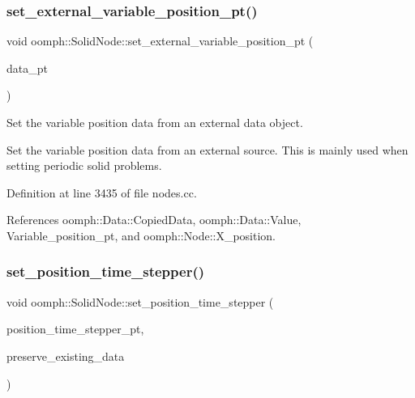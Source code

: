 \subsubsection{\texorpdfstring{set\+\_\+external\+\_\+variable\+\_\+position\+\_\+pt()}{set\_external\_variable\_position\_pt()}}
{\footnotesize\ttfamily void oomph\+::\+Solid\+Node\+::set\+\_\+external\+\_\+variable\+\_\+position\+\_\+pt (\begin{DoxyParamCaption}\item[{\hyperlink{classoomph_1_1Data}{Data} $\ast$const \&}]{data\+\_\+pt }\end{DoxyParamCaption})}



Set the variable position data from an external data object. 

Set the variable position data from an external source. This is mainly used when setting periodic solid problems. 

Definition at line 3435 of file nodes.\+cc.



References oomph\+::\+Data\+::\+Copied\+Data, oomph\+::\+Data\+::\+Value, Variable\+\_\+position\+\_\+pt, and oomph\+::\+Node\+::\+X\+\_\+position.

\mbox{\label{classoomph_1_1SolidNode_a12b206264401d5b2ff6aefff386bdca4}} 
\subsubsection{\texorpdfstring{set\+\_\+position\+\_\+time\+\_\+stepper()}{set\_position\_time\_stepper()}}
{\footnotesize\ttfamily void oomph\+::\+Solid\+Node\+::set\+\_\+position\+\_\+time\+\_\+stepper (\begin{DoxyParamCaption}\item[{\hyperlink{classoomph_1_1TimeStepper}{Time\+Stepper} $\ast$const \&}]{position\+\_\+time\+\_\+stepper\+\_\+pt,  }\item[{const bool \&}]{preserve\+\_\+existing\+\_\+data }\end{DoxyParamCaption})\hspace{0.3cm}{\ttfamily [virtual]}}




